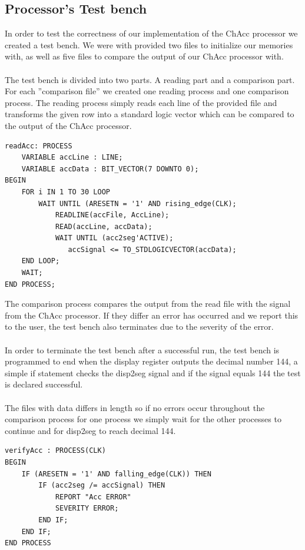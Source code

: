 \documentclass[a4paper,11pt]{article}
\begin{document}
\subsection{Processor's Test bench}
In order to test the correctness of our implementation of the ChAcc processor 
we created a test bench. We were with provided two files to initialize our 
memories with, as well as five files to compare the output of our ChAcc 
processor with.\\\\
\noindent
The test bench is divided into two parts. A reading part and a comparison part. 
For each ''comparison file'' we created one reading 
process and one comparison process. The reading process simply reads each 
line of the provided file and transforms the given row into a standard 
logic vector which can be compared to the output of the ChAcc processor.\\

\begin{lstlisting}[frame=single]
readAcc: PROCESS
    VARIABLE accLine : LINE;
    VARIABLE accData : BIT_VECTOR(7 DOWNTO 0);
BEGIN
    FOR i IN 1 TO 30 LOOP
        WAIT UNTIL (ARESETN = '1' AND rising_edge(CLK);
            READLINE(accFile, AccLine);
            READ(accLine, accData);
            WAIT UNTIL (acc2seg'ACTIVE);
               accSignal <= TO_STDLOGICVECTOR(accData);
    END LOOP;
    WAIT;
END PROCESS;
\end{lstlisting}

\noindent
The comparison process compares the output from the read file with the signal 
from the ChAcc processor. If they differ an error has occurred and we report 
this to the user, the test bench also terminates due to the severity of the 
error.\\\\
\noindent
In order to terminate the test bench after a successful run, the test bench 
is programmed to end when the display register outputs the decimal number 144, 
a simple if statement checks the disp2seg signal and if the signal equals 144 
the test is declared successful.\\\\
\noindent
The files with data differs in length so if no errors occur throughout 
the comparison process for one process we simply wait for the other 
processes to continue and for disp2seg to reach decimal 144.\\

\begin{lstlisting}[frame=single]
verifyAcc : PROCESS(CLK)
BEGIN
    IF (ARESETN = '1' AND falling_edge(CLK)) THEN
        IF (acc2seg /= accSignal) THEN
            REPORT "Acc ERROR"
            SEVERITY ERROR;
        END IF;
    END IF;
END PROCESS
\end{lstlisting}
\end{document}
